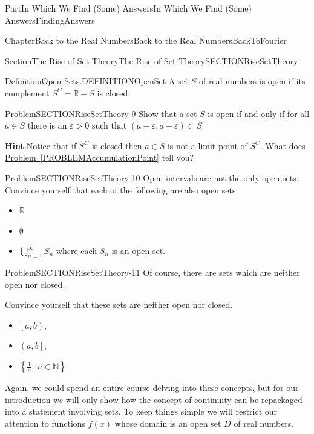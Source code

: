\documentclass[oneside,10pt,]{book}
\newcommand{\blocktitlefont}{\relax}
\newcommand{\xreffont}{\relax}
\numberwithin{equation}{part}
\newcommand{\eps}{\varepsilon}
\newcommand{\RR}{\mathbb {R}}
\newcommand{\NN}{\mathbb {N}}
\begin{document}
\begin{partptx}{Part}{In Which We Find (Some) Answers}{}{In Which We Find (Some) Answers}{}{}{FindingAnswers}
\begin{chapterptx}{Chapter}{Back to the Real Numbers}{}{Back to the Real Numbers}{}{}{BackToFourier}
\begin{sectionptx}{Section}{The Rise of Set Theory}{}{The Rise of Set Theory}{}{}{SECTIONRiseSetTheory}
\begin{definition}{Definition}{Open Sets.}{DEFINITIONOpenSet}%
%
%
A set \(S\) of real numbers is open if its complement \(S^C=\RR-S\) is closed.%
\end{definition}
\begin{problem}{Problem}{}{SECTIONRiseSetTheory-9}%
Show that a set \(S\) is open if and only if for all \(a\in S\) there is an \(\eps >0\) such that \(\left(a-\eps ,a+\eps \right)\subset S\)%
\par\smallskip%
\noindent\textbf{\blocktitlefont Hint}.\hypertarget{SECTIONRiseSetTheory-9-2}{}\quad{}Notice that if \(S^C\) is closed then  \(a\in S\) is not a limit point of \(S^C\). What does \hyperref[PROBLEMAccumulationPoint]{Problem~{\xreffont\ref{PROBLEMAccumulationPoint}}} tell you?%
\end{problem}
\begin{problem}{Problem}{}{SECTIONRiseSetTheory-10}%
Open intervals are not the only open sets. Convince yourself that each of the following are also open sets.%
\begin{itemize}[label=\textbullet]
\item{}\(\displaystyle \RR \)%
\item{}\(\displaystyle \emptyset\)%
\item{}\(\displaystyle\bigcup^{\infty }_{n=1}{S_n}\) where each \(S_n\) is an open set.%
\end{itemize}
%
\end{problem}
\begin{problem}{Problem}{}{SECTIONRiseSetTheory-11}%
Of course, there are sets which are neither open nor closed.%
\par
Convince yourself that these sets are neither open nor closed.%
\begin{itemize}[label=\textbullet]
\item{}\(\left[a,b\right)\),%
\item{}\(\left(a,b\right]\),%
\item{}\(\displaystyle \left\{\frac{1}{n},\ n\in \NN\right\}\)%
\end{itemize}
%
\end{problem}
Again, we could spend an entire course delving into these concepts, but for our introduction we will only show how the concept of continuity can be repackaged into a statement involving sets. To keep things simple we will restrict our attention to functions \(f(x)\) whose domain is an open set \(D\) of real numbers.%
\par

\end{sectionptx}
\end{chapterptx}
\end{partptx}
\end{document}
